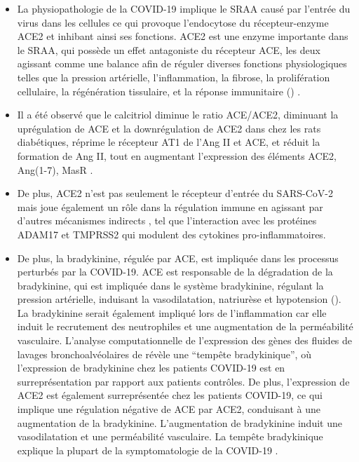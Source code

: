 \documentclass[
  a4paper,
  DIV=11,
  numbers=noendperiod,
  listof=totoc]{scrreprt}
\begin{document}
\begin{itemize}
\item
  La physiopathologie de la COVID-19 implique le \ac{SRAA} causé par
  l'entrée du virus dans les cellules ce qui provoque l'endocytose du
  récepteur-enzyme ACE2 et inhibant ainsi ses fonctions. ACE2 est une
  enzyme importante dans le \ac{SRAA}, qui possède un effet antagoniste
  du récepteur ACE, les deux agissant comme une balance afin de réguler
  diverses fonctions physiologiques telles que la pression artérielle,
  l'inflammation, la fibrose, la prolifération cellulaire, la
  régénération tissulaire, et la réponse immunitaire
  () \autocite{Brojakowska.2020}.
\item
  Il a été observé que le calcitriol diminue le ratio ACE/ACE2,
  diminuant la uprégulation de ACE et la downrégulation de ACE2 dans
  chez les rats diabétiques, réprime le récepteur AT1 de l'Ang II et
  ACE, et réduit la formation de Ang II, tout en augmentant l'expression
  des éléments ACE2, Ang(1-7), MasR \autocite{Mahdavi.2020}.
\item
  De plus, ACE2 n'est pas seulement le récepteur d'entrée du SARS-CoV-2
  mais joue également un rôle dans la régulation immune en agissant par
  d'autres mécanismes indirects \autocites[ ]{Argano.2023}{Zipeto.2020},
  tel que l'interaction avec les protéines ADAM17 et TMPRSS2 qui
  modulent des cytokines pro-inflammatoires.
\item
  De plus, la bradykinine, régulée par ACE, est impliquée dans les
  processus perturbés par la COVID-19. ACE est responsable de la
  dégradation de la bradykinine, qui est impliquée dans le système
  bradykinine, régulant la pression artérielle, induisant la
  vasodilatation, natriurèse et hypotension (). La
  bradykinine serait également impliqué lors de l'inflammation car elle
  induit le recrutement des neutrophiles et une augmentation de la
  perméabilité vasculaire. L'analyse computationnelle de l'expression
  des gènes des fluides de lavages bronchoalvéolaires de
  \textcite{Garvin.2020} révèle une ``tempête bradykinique'', où
  l'expression de bradykinine chez les patients COVID-19 est en
  surreprésentation par rapport aux patients contrôles. De plus,
  l'expression de ACE2 est également surreprésentée chez les patients
  COVID-19, ce qui implique une régulation négative de ACE par ACE2,
  conduisant à une augmentation de la bradykinine. L'augmentation de
  bradykinine induit une vasodilatation et une perméabilité vasculaire.
  La tempête bradykinique explique la plupart de la symptomatologie de
  la COVID-19 \autocite{Garvin.2020}.
\end{itemize}
\end{document}
